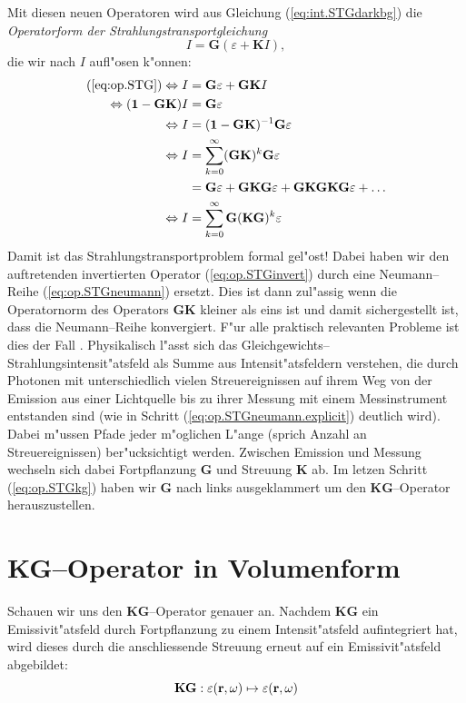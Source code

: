 	Mit diesen neuen Operatoren wird aus Gleichung (\ref{eq:int.STGdarkbg}) die {\em Operatorform der Strahlungstransportgleichung}
	\begin{equation}
		I=\mathbf{G}(\varepsilon + \mathbf{K}I),
		\label{eq:op.STG}
	\end{equation}
	die wir nach $I$ aufl"osen k"onnen:
	\begin{align}
		(\ref{eq:op.STG}) \Leftrightarrow I&=\mathbf{G}\varepsilon + \mathbf{GK}I \nonumber \\
		\Leftrightarrow (\mathbf{1}-\mathbf{GK})I &= \mathbf{G}\varepsilon \nonumber \\
		\Leftrightarrow I &= (\mathbf{1}-\mathbf{GK})^{-1}\mathbf{G}\varepsilon \label{eq:op.STGinvert} \\
		\Leftrightarrow I &= \sum_{k=0}^\infty (\mathbf{GK})^k \mathbf{G}\varepsilon \label{eq:op.STGneumann} \\
		&=\mathbf{G}\varepsilon + \mathbf{GKG}\varepsilon + \mathbf{GKGKG}\varepsilon + \hdots \label{eq:op.STGneumann.explicit} \\
		\Leftrightarrow I &=\sum_{k=0}^\infty \mathbf{G} (\mathbf{KG})^k \varepsilon \label{eq:op.STGkg}
	\end{align}
	Damit ist das Strahlungstransportproblem formal gel"ost! Dabei haben wir den auftretenden invertierten Operator (\ref{eq:op.STGinvert}) durch eine Neumann--Reihe (\ref{eq:op.STGneumann}) ersetzt. Dies ist dann zul"assig wenn die Operatornorm des Operators $\mathbf{GK}$ kleiner als eins ist und damit sichergestellt ist, dass die Neumann--Reihe konvergiert. F"ur alle praktisch relevanten Probleme ist dies der Fall \citep[siehe][Theorem 12 und 13]{Arvo:1995p9257}. Physikalisch l"asst sich das Gleichgewichts--Strahlungsintensit"atsfeld als Summe aus Intensit"atsfeldern verstehen, die durch Photonen mit unterschiedlich vielen Streuereignissen auf ihrem Weg von der Emission aus einer Lichtquelle bis zu ihrer Messung mit einem Messinstrument entstanden sind (wie in Schritt (\ref{eq:op.STGneumann.explicit}) deutlich wird). Dabei m"ussen Pfade jeder m"oglichen L"ange (sprich Anzahl an Streuereignissen) ber"ucksichtigt werden. Zwischen Emission und Messung wechseln sich dabei Fortpflanzung $\mathbf{G}$ und Streuung $\mathbf{K}$ ab. Im letzen Schritt (\ref{eq:op.STGkg}) haben wir $\mathbf{G}$ nach links ausgeklammert um den $\mathbf{KG}$--Operator herauszustellen.
	
	
	\section{KG--Operator in Volumenform}
	Schauen wir uns den $\mathbf{KG}$--Operator genauer an. Nachdem $\mathbf{KG}$ ein Emissivit"atsfeld durch Fortpflanzung zu einem Intensit"atsfeld aufintegriert hat, wird dieses durch die anschliessende Streuung erneut auf ein Emissivit"atsfeld abgebildet:
	\begin{equation*}
		\mathbf{KG} : \varepsilon(\mathbf{r},\omega) \mapsto \varepsilon(\mathbf{r},\omega)
	\end{equation*}

